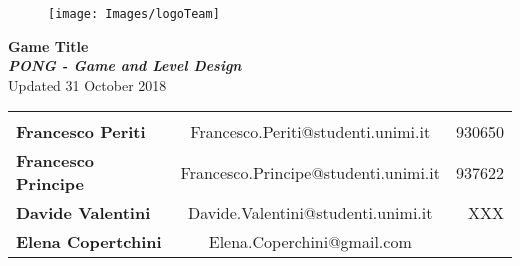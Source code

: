 \documentclass[12pt]{report}
\begin{document}
\begin{center}
  \begin{figure}
    \centering
  \vspace*{5\baselineskip}
  \texttt{[image: Images/logoTeam]}
  \end{figure}

  {\huge \textbf{Game Title}} \\
  {\large \textbf{ \textit{PONG - Game and Level Design}}} \\
  Updated 31 October 2018 \\

\begin{tabular}{lcr}\\\\
\textbf{Francesco Periti}    & Francesco.Periti@studenti.unimi.it   & 930650 \\
\textbf{Francesco Principe}  & Francesco.Principe@studenti.unimi.it & 937622 \\
\textbf{Davide Valentini}    & Davide.Valentini@studenti.unimi.it   & XXX \\
\textbf{Elena Copertchini}   & Elena.Coperchini@gmail.com & \\
\end{tabular}

\end{center}







  
\end{document}
